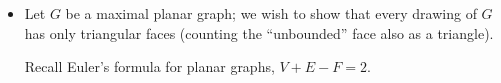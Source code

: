 \begin{itemize}
  \item Let \(G\) be a maximal planar graph; we wish to show that every drawing of \(G\) has only triangular faces (counting the ``unbounded'' face also as a triangle).

    Recall Euler's formula for planar graphs, \(V+E-F=2\).

\end{itemize}

